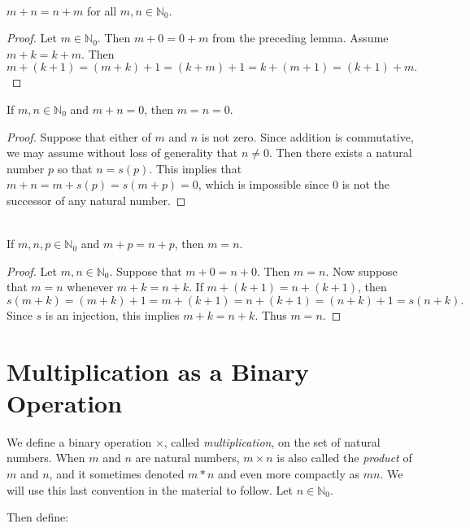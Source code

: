\begin{theorem}{}\\
$m+n=n+m$ for all $m,n\in \mathbb{N}_0$.
\end{theorem}

\begin{proof}
Let $m\in \mathbb{N}_0$. Then $m+0=0+m$ from the preceding lemma.
Assume $m+k=k+m$. Then
\[
m+(k+1)=(m+k)+1=(k+m)+1= k+(m+1) = (k+1)+m.
\]
\end{proof}

\begin{lemma}\label{lem:sum0}
If $m,n\in\mathbb{N}_0$ and $m+n=0$, then $m=n=0$.
\end{lemma}

\begin{proof}
Suppose that either of $m$ and $n$ is not zero. Since addition
is commutative, we may assume without loss of generality that
$n\neq0$.  Then there exists a natural number
$p$ so that $n=s(p)$.  This implies that $m+n=m+s(p)=s(m+p)=0$,
which is impossible since $0$ is not the successor of any
natural number.
\end{proof}

\begin{theorem}{}\\
If $m,n,p\in \mathbb{N}_0$ and $m+p=n+p$, then $m=n$.
\end{theorem}

\begin{proof}
Let $m,n\in \mathbb{N}_0$.  Suppose that $m+0=n+0$.  Then $m=n$.
Now suppose that $m=n$ whenever $m+k=n+k$.
If $m+(k+1)=n+(k+1)$, then 
\[
s(m+k)=(m+k)+1=m+(k+1)=n+(k+1)=(n+k)+1=s(n+k).
\]
Since $s$ is an
injection, this implies $m+k=n+k$.  Thus $m=n$.
\end{proof}

\section{Multiplication as a Binary Operation}\label{s:mult}

We define a binary operation $\times$, called \textit{multiplication}, 
on the set of natural numbers.  When $m$ and $n$ are natural
numbers, $m\times n$ is also called the \textit{product}
of $m$ and $n$, and it sometimes denoted 
$m*n$ and even more compactly as $mn$.  We will use this
last convention in the material to follow. Let $n\in \mathbb{N}_0$. 

Then define:

